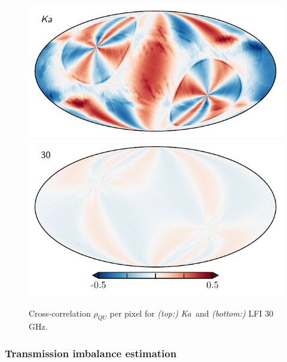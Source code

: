 \documentclass[twocolumn]{../../common/aa}
\newcommand{\Ka}[0]{\textit{Ka}}
\begin{document}
\begin{figure}
	\centering
	\includegraphics[width=\columnwidth]{figures/rho_QU_Ka.pdf}\\
	\includegraphics[width=\columnwidth]{figures/rho_QU_30.pdf}
	\caption{Cross-correlation $\rho_{QU}$ per pixel for \textit{(top:)} \Ka\ and \textit{(bottom:)} LFI 30\,GHz.}
\end{figure}


\subsubsection{Transmission imbalance estimation}
\label{ssec:imbalance}
\end{document}
